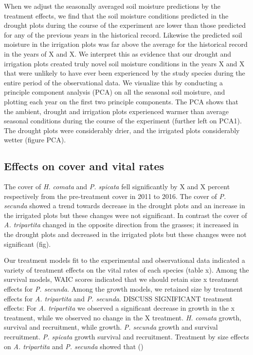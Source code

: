 \documentclass[11pt]{article}
\begin{document}
\begin{doublespacing}
When we adjust the seasonally averaged soil moisture predictions by the treatment effects, we find that the soil moisture conditions predicted in the drought plots during the course of the experiment are lower than those predicted for any of the previous years in the historical record.  Likewise the predicted soil moisture in the irrigation plots was far above the average for the historical record in the years of X and X.  We interpret this as evidence that our drought and irrigation plots created truly novel soil moisture conditions in the years X and X that were unlikely to have ever been experienced by the study species during the entire period of the observational data. We visualize this by conducting a principle component analysis (PCA) on all the seasonal soil moisture, and plotting each year on the first two principle components. The PCA shows that the ambient, drought and irrigation plots experienced warmer than average seasonal conditions during the course of the experiment (further left on PCA1).  The drought plots were considerably drier, and the irrigated plots considerably wetter (figure PCA). 

\subsection*{Effects on cover and vital rates}

The cover of \textit{H. comata} and \textit{P. spicata} fell significantly by X and X percent respectively from the pre-treatment cover in 2011 to 2016. The cover of \textit{P. secunda} showed a trend towards decrease in the drought plots and an increase in the irrigated plots but these changes were not significant.  In contrast the cover of \textit{A. tripartita} changed in the opposite direction from the grasses; it increased in the drought plots and decreased in the irrigated plots but these changes were not significant (fig). 

Our treatment models fit to the experimental and observational data indicated a variety of treatment effects on the vital rates of each species (table x). Among the survival models, WAIC scores indicated that we should retain size x treatment effects for \textit{P. secunda}.  Among the growth models, we retained size by treatment effects for \textit{A. tripartita} and \textit{P. secunda}. DISCUSS SIGNIFICANT treatment effects: For \textit{A. tripartita} we observed a significant decrease in growth in the x treatment, while we observed no change in the X treatment.  \textit{H. comata} growth, survival and recruitment, while growth. \textit{P. secunda} growth and survival recruitment.  \textit{P. spicata} growth survival and recruitment. Treatment by size effects on \textit{A. tripartita} and \textit{P. secunda} showed that ()


\end{doublespacing}
\end{document}
